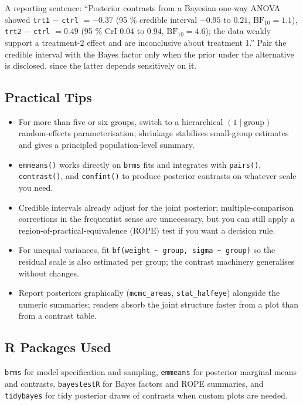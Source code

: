 \documentclass[
]{article}
\providecommand{\tightlist}{%
  \setlength{\itemsep}{0pt}\setlength{\parskip}{0pt}}
\begin{document}
A reporting sentence: ``Posterior contrasts from a Bayesian one-way
ANOVA showed \texttt{trt1} \(-\) \texttt{ctrl} \(= -0.37\) (95 \%
credible interval \(-0.95\) to \(0.21\), \(\mathrm{BF}_{10} = 1.1\)),
\texttt{trt2} \(-\) \texttt{ctrl} \(= 0.49\) (95 \% CrI 0.04 to 0.94,
\(\mathrm{BF}_{10} = 4.6\)); the data weakly support a treatment-2
effect and are inconclusive about treatment 1.'' Pair the credible
interval with the Bayes factor only when the prior under the alternative
is disclosed, since the latter depends sensitively on it.

\subsection{Practical Tips}\label{practical-tips}

\begin{itemize}
\tightlist
\item
  For more than five or six groups, switch to a hierarchical
  \((1 \mid \mathrm{group})\) random-effects parameterisation; shrinkage
  stabilises small-group estimates and gives a principled
  population-level summary.
\item
  \texttt{emmeans()} works directly on \texttt{brms} fits and integrates
  with \texttt{pairs()}, \texttt{contrast()}, and \texttt{confint()} to
  produce posterior contrasts on whatever scale you need.
\item
  Credible intervals already adjust for the joint posterior;
  multiple-comparison corrections in the frequentist sense are
  unnecessary, but you can still apply a region-of-practical-equivalence
  (ROPE) test if you want a decision rule.
\item
  For unequal variances, fit
  \texttt{bf(weight\ \textasciitilde{}\ group,\ sigma\ \textasciitilde{}\ group)}
  so the residual scale is also estimated per group; the contrast
  machinery generalises without changes.
\item
  Report posteriors graphically (\texttt{mcmc\_areas},
  \texttt{stat\_halfeye}) alongside the numeric summaries; readers
  absorb the joint structure faster from a plot than from a contrast
  table.
\end{itemize}

\subsection{R Packages Used}\label{r-packages-used}

\texttt{brms} for model specification and sampling, \texttt{emmeans} for
posterior marginal means and contrasts, \texttt{bayestestR} for Bayes
factors and ROPE summaries, and \texttt{tidybayes} for tidy posterior
draws of contrasts when custom plots are needed.
\end{document}
